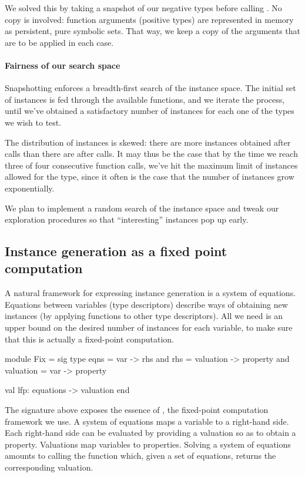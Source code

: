 We solved this by taking a snapshot of our negative types before calling
. No copy is involved: function arguments (positive types) are
represented in memory as persistent, pure symbolic sets. That way, we keep a
copy of the arguments that are to be applied in each  case.

\paragraph{Fairness of our search space}
Snapshotting enforces a breadth-first search of the instance space. The initial
set of instances is fed through the available functions, and we iterate the
process, until we've obtained a satisfactory number of instances for each one of
the types we wish to test.

The distribution of instances is skewed: there are more instances obtained after
 calls than there are after  calls. It may thus be the case
that by the time we reach three of four consecutive function calls, we've hit
the maximum limit of instances allowed for the type, since it often is the case
that the number of instances grow exponentially.

We plan to implement a random search of the instance space and tweak our
exploration procedures so that ``interesting'' instances pop up early.

\subsection{Instance generation as a fixed point computation}
A natural framework for expressing instance generation is a system of equations.
Equations between variables (type descriptors) describe ways of obtaining new
instances (by applying functions to other type descriptors). All we need is an
upper bound on the desired number of instances for each variable, to make sure
that this is actually a fixed-point computation.
%
\begin{ocamlcode}
module Fix = sig
  type     eqns = var -> rhs
  and       rhs = valuation -> property
  and valuation = var -> property

  val       lfp:  equations -> valuation
end
\end{ocamlcode}
%
The signature above exposes the essence of , the fixed-point computation
framework we use. A system of equations maps a variable to a right-hand side.
Each right-hand side can be evaluated by providing a valuation so as to obtain a
property. Valuations map variables to properties. Solving a system of equations
amounts to calling the  function which, given a set of equations,
returns the corresponding valuation.

